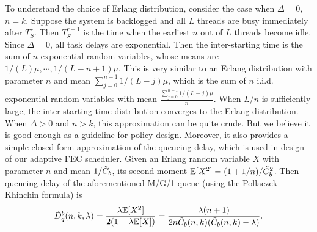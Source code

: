 \documentclass[journal]{IEEEtran}
\newcommand{\Expect}{\mathbb{E}}
\begin{document}
To understand the choice of Erlang distribution, consider the case when $\Delta=0$, $n=k$.
Suppose the system is backlogged and all $L$ threads are busy immediately after $T_S^r$. Then $T_S^{r+1}$ is the time when the earliest $n$ out of $L$ threads become idle. Since $\Delta=0$, all task delays are exponential. Then the inter-starting time is the sum of $n$ exponential random variables, whose means are $1/(L)\mu,\cdots,1/(L-n+1)\mu$. This is very similar to an Erlang distribution with parameter $n$ and mean $\sum_{j=0}^{n-1}1/(L-j)\mu$, which is the sum of $n$ i.i.d. exponential random variables with mean $\frac{\sum_{j=0}^{n-1}1/(L-j)\mu}{n}$. When $L/n$ is sufficiently large, the inter-starting time distribution converges to the Erlang distribution.
When $\Delta> 0$ and $n>k$, this approximation can be quite crude. But we believe it is good enough as a guideline for policy design. Moreover, it also provides a simple closed-form approximation of the queueing delay, which is used in design of our adaptive FEC scheduler. 
Given an Erlang random variable  $X$ with parameter $n$ and mean $1/\tilde{C}_b$, its second moment $\Expect[X^2] = (1+1/n)/\appxC_b^2$. Then queueing delay of the aforementioned M/G/1 queue (using the Pollaczek-Khinchin formula) is
\begin{align*}
\tilde{D}_q^b(n,k,\lambda) = \frac{\lambda \mathbb{E}[X^2]}{2(1-\lambda \mathbb{E}[X])}
 =\frac{\lambda(n+1)}{2n\tilde{C}_b(n,k)(\tilde{C}_b(n,k)-\lambda)}.
\label{eq:blocking:apprxDelay}
\end{align*}
\end{document}
